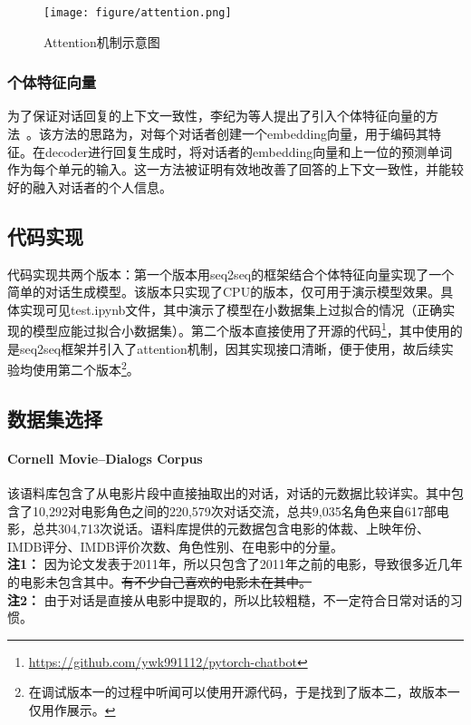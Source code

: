 \documentclass[12pt]{article} %
\begin{document}
\begin{sloppypar}
\begin{figure}[h]
	\centering
	\texttt{[image: figure/attention.png]}
	\caption{Attention机制示意图\protect\footnotemark}
\end{figure}

\subsubsection{个体特征向量}

为了保证对话回复的上下文一致性，李纪为等人提出了引入个体特征向量的方法~\cite{li2016persona}。该方法的思路为，对每个对话者创建一个embedding向量，用于编码其特征。在decoder进行回复生成时，将对话者的embedding向量和上一位的预测单词作为每个单元的输入。这一方法被证明有效地改善了回答的上下文一致性，并能较好的融入对话者的个人信息。

\subsection{代码实现}

代码实现共两个版本：第一个版本用seq2seq的框架结合个体特征向量实现了一个简单的对话生成模型。该版本只实现了CPU的版本，仅可用于演示模型效果。具体实现可见test.ipynb文件，其中演示了模型在小数据集上过拟合的情况（正确实现的模型应能过拟合小数据集）。第二个版本直接使用了开源的代码\footnote{\url{https://github.com/ywk991112/pytorch-chatbot}}，其中使用的是seq2seq框架并引入了attention机制，因其实现接口清晰，便于使用，故后续实验均使用第二个版本\footnote{在调试版本一的过程中听闻可以使用开源代码，于是找到了版本二，故版本一仅用作展示。}。

\subsection{数据集选择}

\paragraph{{\bf Cornell Movie--Dialogs Corpus}~\cite{Danescu-Niculescu-Mizil+Lee:11a}} 该语料库包含了从电影片段中直接抽取出的对话，对话的元数据比较详实。其中包含了10,292对电影角色之间的220,579次对话交流，总共9,035名角色来自617部电影，总共304,713次说话。语料库提供的元数据包含电影的体裁、上映年份、IMDB评分、IMDB评价次数、角色性别、在电影中的分量。\\
{\bf 注1：} 因为论文发表于2011年，所以只包含了2011年之前的电影，导致很多近几年的电影未包含其中。\sout{有不少自己喜欢的电影未在其中。}\\
{\bf 注2：} 由于对话是直接从电影中提取的，所以比较粗糙，不一定符合日常对话的习惯。


\end{sloppypar}
\end{document}
